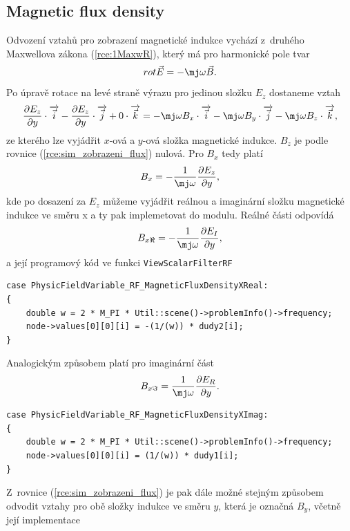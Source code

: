 \subsection*{Magnetic flux density}
Odvození vztahů pro zobrazení magnetické indukce vychází z~druhého Maxwellova zákona (\ref{rce:1MaxwR}), který má pro harmonické pole tvar
\begin{displaymath}
	rot\vec E = -\mj\omega\vec B.
\end{displaymath}
Po úpravě rotace na levé straně výrazu pro jedinou složku $E_z$ dostaneme vztah
\begin{equation}
	\frac{\partial E_z}{\partial y}\cdot\overrightarrow{\vec{i}} - \frac{\partial E_z}{\partial y}\cdot\overrightarrow{\vec{j}} + 0\cdot\overrightarrow{\vec{k}} = -\mj\omega B_x\cdot\overrightarrow{\vec{i}} - \mj\omega B_y\cdot\overrightarrow{\vec{j}} - \mj\omega B_z\cdot\overrightarrow{\vec{k}},
	\label{rce:sim_zobrazeni_flux}
\end{equation}
ze kterého lze vyjádřit $x$-ová a $y$-ová složka magnetické indukce. $B_z$ je podle rovnice (\ref{rce:sim_zobrazeni_flux}) nulová. Pro $B_x$ tedy platí
\begin{displaymath}
	B_x = -\frac{1}{\mj\omega}\frac{\partial E_z}{\partial y},
\end{displaymath}
kde po dosazení za $E_z$ můžeme vyjádřit reálnou a imaginární složku magnetické indukce ve směru x a ty pak implemetovat do modulu. Reálné části odpovídá 
\begin{equation}
	B_{x\Re} = -\frac{1}{\mj\omega}\frac{\partial E_I}{\partial y},
	\label{rce:sim_flux_x_re}
\end{equation}
a její programový kód ve funkci \texttt{ViewScalarFilterRF}
\begin{verbatim}
case PhysicFieldVariable_RF_MagneticFluxDensityXReal:
{
    double w = 2 * M_PI * Util::scene()->problemInfo()->frequency;
    node->values[0][0][i] = -(1/(w)) * dudy2[i];
}
\end{verbatim}
Analogickým způsobem platí pro imaginární část
\begin{equation}
	B_{x\Im} = \frac{1}{\mj\omega}\frac{\partial E_R}{\partial y}.
	\label{rce:sim_flux_x_im}
\end{equation}
\begin{verbatim}
case PhysicFieldVariable_RF_MagneticFluxDensityXImag:
{
    double w = 2 * M_PI * Util::scene()->problemInfo()->frequency;
    node->values[0][0][i] = (1/(w)) * dudy1[i];
}    
\end{verbatim}
Z~rovnice (\ref{rce:sim_zobrazeni_flux}) je pak dále možné stejným způsobem odvodit vztahy pro obě složky indukce ve směru $y$, která je označná $B_y$, včetně její implementace
